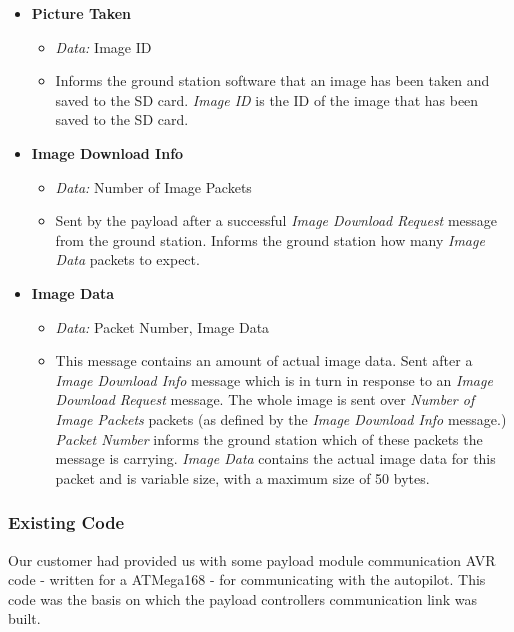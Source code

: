 \begin{itemize}

\item \textbf{Picture Taken}

\begin{itemize}
\item \emph{Data:} Image ID

\item Informs the ground station software that an image has been taken and 
saved to the SD card. \emph{Image ID} is the ID of the image that has been 
saved to the SD card.
\end{itemize} 

\item \textbf{Image Download Info}

\begin{itemize}

\item \emph{Data:} Number of Image Packets

\item Sent by the payload after a successful \emph{Image Download Request}
message from the ground station. Informs the ground station how many 
\emph{Image Data} packets to expect.
\end{itemize}

\item \textbf{Image Data} 
\begin{itemize}
\item \emph{Data:} Packet Number, Image Data
\item This message contains an amount of actual image data. Sent after a
\emph{Image Download Info} message which is in turn in response to an 
\emph{Image Download Request} message. The whole image is sent over
\emph{Number of Image Packets} packets (as defined by the \emph{Image Download
Info} message.) \emph{Packet Number} informs the ground station which of these
packets the message is carrying. \emph{Image Data} contains the actual image 
data for this packet and is variable size, with a maximum size of 50 bytes. 
\end{itemize}

\end{itemize}


\subsubsection{Existing Code}
\label{sec:payload_existing_code}
Our customer had provided us with some payload module communication AVR code
- written for a ATMega168 - for communicating with the autopilot. This code
was the basis on which the payload controllers communication link was built.

